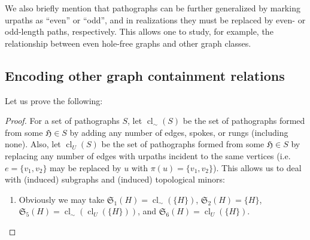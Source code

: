 \documentclass{article}
\newcommand{\Hf}{\mathfrak{H}}
\newcommand{\Sf}{\mathfrak{S}}
\DeclareMathOperator{\cl}{cl}
\begin{document}
We also briefly mention that pathographs can be further generalized by marking urpaths as ``even'' or ``odd'', and in realizations they must be replaced by even- or odd-length paths, respectively. This allows one to study, for example, the relationship between even hole-free graphs and other graph classes.

\subsection{Encoding other graph containment relations}

Let us prove the following:
\encode*
\begin{proof}
For a set of pathographs $S$, let $\cl_\sim(S)$ be the set of pathographs formed from some $\Hf\in S$ by adding any number of edges, spokes, or rungs (including none). Also, let $\cl_U(S)$ be the set of pathographs formed from some $\Hf\in S$ by replacing any number of edges with urpaths incident to the same vertices (i.e.\ $e=\{v_1,v_2\}$ may be replaced by $u$ with $\pi(u)=\{v_1,v_2\}$). This allows us to deal with (induced) subgraphs and (induced) topological minors:
\begin{enumerate}
    \item[1, 2, 5, 6.] Obviously we may take $\Sf_1(H)=\cl_\sim(\{H\})$, $\Sf_2(H)=\{H\}$, $\Sf_5(H)=\cl_\sim(\cl_U(\{H\}))$, and $\Sf_6(H)=\cl_U(\{H\})$.
\end{enumerate}


\end{proof}
\end{document}
